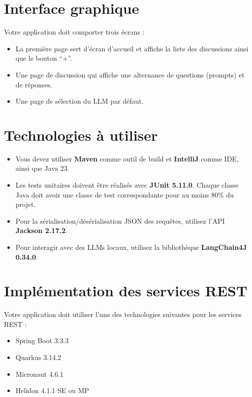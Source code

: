 \documentclass{article}
\begin{document}
\section{Interface graphique}

Votre application doit comporter trois écrans :
\begin{itemize}
    \item La première page sert d'écran d'accueil et affiche la liste des discussions ainsi que le bouton ``+''.
    \item Une page de discussion qui affiche une alternance de questions (prompts) et de réponses.
    \item Une page de sélection du LLM par défaut.
\end{itemize}

\section{Technologies à utiliser}

\begin{itemize}
    \item Vous devez utiliser \textbf{Maven} comme outil de build et \textbf{IntelliJ} comme IDE, ainsi que Java 23.
    \item Les tests unitaires doivent être réalisés avec \textbf{JUnit 5.11.0}. Chaque classe Java doit avoir une classe de test correspondante pour au moins 80\% du projet.
    \item Pour la sérialisation/désérialisation JSON des requêtes, utilisez l'API \textbf{Jackson 2.17.2}.
    \item Pour interagir avec des LLMs locaux, utilisez la bibliothèque \textbf{LangChain4J 0.34.0}.
\end{itemize}

\section{Implémentation des services REST}

Votre application doit utiliser l'une des technologies suivantes pour les services REST :
\begin{itemize}
    \item Spring Boot 3.3.3
    \item Quarkus 3.14.2
    \item Micronaut 4.6.1
    \item Helidon 4.1.1 SE ou MP
\end{itemize}
\end{document}

